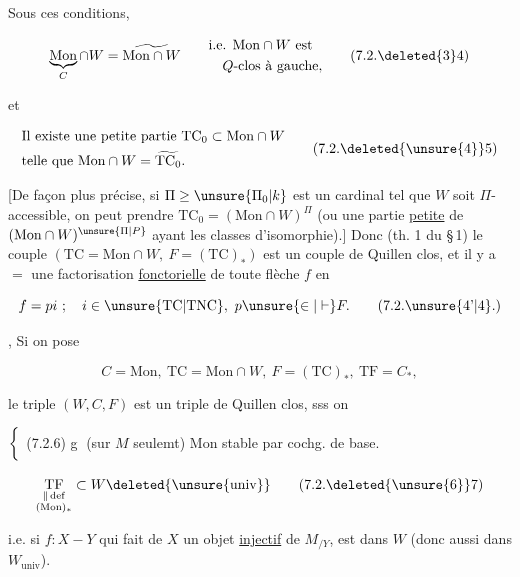 

Sous ces conditions, 

\[
\underbrace{\mathrm{Mon}}_{C}\cap W=\widetilde{\mathrm{Mon}\cap W}\qquad
\begin{aligned}&\text{i.e. }\mathrm{Mon}\cap W\text{ est}\\&\quad Q\text{-clos à gauche},\end{aligned}
\tag*{(7.2.\deleted{3}4)}
\]

et

\[
\begin{aligned}
&\text{Il existe une petite partie }\mathrm{TC}_0\subset\mathrm{Mon}\cap W\\
&\text{telle que }\mathrm{Mon}\cap W=\widetilde{\mathrm{TC}_0}.
\end{aligned}\tag*{(7.2.\deleted{\unsure{4}}5)}
\]

[De façon plus précise, si $\Pi\geq\unsure{\Pi_0|k}$ est un cardinal tel que $W$ soit $\Pi$-accessible, on peut prendre  $\mathrm{TC}_0=(\mathrm{Mon}\cap W)^{\Pi}$ (ou une partie \uline{petite} de $(\mathrm{Mon}\cap W)^{\unsure{\Pi|P}}$ ayant les  classes d'isomorphie).]  Donc (th. 1 du \S\,1) le couple $(\mathrm{TC}=\mathrm{Mon}\cap W,\ F=(\mathrm{TC})_*)$ est un couple de Quillen clos, et il y a $=$ une factorisation \uline{fonctorielle} de toute flèche $f$ en

\[
f=pi\ ;\quad i\in\unsure{\mathrm{TC}|\mathrm{TNC}},\ p\unsure{\in|\vdash}F.\tag*{(7.2.\unsure{4'|4}.)}
\]

, Si on pose

\[
C=\mathrm{Mon},\ \mathrm{TC}=\mathrm{Mon}\cap W,\ F=(\mathrm{TC})_*,\ \mathrm{TF}=C_*,\tag*{(7.2.5.)}
\]

le triple $(W,C,F)$ est un triple de Quillen clos, sss on  

$\left\{\vphantom{\dfrac{A}{A}}\right.$ (7.2.6) \textcircled{g}  (sur $M$ seulemt) $\mathrm{Mon}$ stable par cochg. de base.

\[
\underset{\substack{\Vert\,\mathrm{def}\\(\mathrm{Mon})_*}}{\mathrm{TF}}\subset W\deleted{\unsure{\mathrm{univ}}} \tag*{(7.2.\deleted{\unsure{6}}7)}
\]

i.e. si   $f\colon X\mathrel{-}Y$ qui fait de $X$ un objet \uline{injectif} de $M_{/Y}$, est dans $W$ (donc aussi dans $W_{\mathrm{univ}}$).
